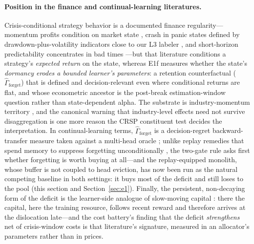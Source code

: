 \documentclass{article}
\begin{document}
\paragraph{Position in the finance and continual-learning literatures.}
Crisis-conditional strategy behavior is a documented finance
regularity---momentum profits condition on market state
\citep{cooper2004market}, crash in panic states defined by
drawdown-plus-volatility indicators close to our L3 labeler
\citep{daniel2016momentum}, and short-horizon predictability
concentrates in bad times \citep{rapach2010out, henkel2011time}---but
that literature conditions a strategy's \emph{expected return} on the
state, whereas E1f measures whether the state's \emph{dormancy erodes a
bounded learner's parameters}: a retention counterfactual
($\hat\Gamma_{\mathrm{forget}}$) that is defined and decision-relevant
even where conditional returns are flat, and whose econometric ancestor
is the post-break estimation-window question
\citep{pesaran2007selection} rather than state-dependent alpha. The
substrate is industry-momentum territory
\citep{moskowitz1999industries}, and the canonical warning that
industry-level effects need not survive disaggregation
\citep{grundy2001understanding} is one more reason the CRSP constituent
test decides the interpretation. In continual-learning terms,
$\hat\Gamma_{\mathrm{forget}}$ is a decision-regret backward-transfer
measure taken against a multi-head oracle \citep{lopez2017gradient,
chaudhry2018riemannian}; unlike replay remedies that spend memory to
suppress forgetting unconditionally \citep{rolnick2019experience,
chaudhry2019tiny}, the two-gate rule asks first whether forgetting is
worth buying at all---and the replay-equipped monolith, whose buffer
is not coupled to head eviction, has now been run as the natural
competing baseline in both settings: it buys most of the deficit and
still loses to the pool (this section and Section~\ref{sec:e1}).
Finally, the persistent, non-decaying form of the deficit is the
learner-side analogue of slow-moving capital
\citep{duffie2010presidential, mitchell2007slow}: there the capital,
here the training resource, follows recent reward and therefore
arrives at the dislocation late---and the cost battery's finding that
the deficit \emph{strengthens} net of crisis-window costs is that
literature's signature, measured in an allocator's parameters rather
than in prices.
\end{document}
